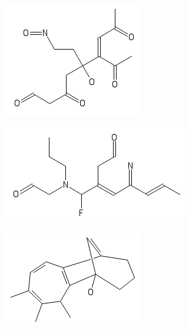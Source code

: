 \documentclass{article}
\begin{document}
\begin{figure}
\begin{subfigure}{0.3\textwidth}
    \end{subfigure}
    \begin{subfigure}{0.3\textwidth}
        \includegraphics[width=\textwidth]{m5.png}
    \end{subfigure}
    \begin{subfigure}{0.3\textwidth}
        \includegraphics[width=\textwidth]{m6.png}
    \end{subfigure}
    \begin{subfigure}{0.3\textwidth}
        \includegraphics[width=\textwidth]{m7.png}

\end{subfigure}
\end{figure}
\end{document}
